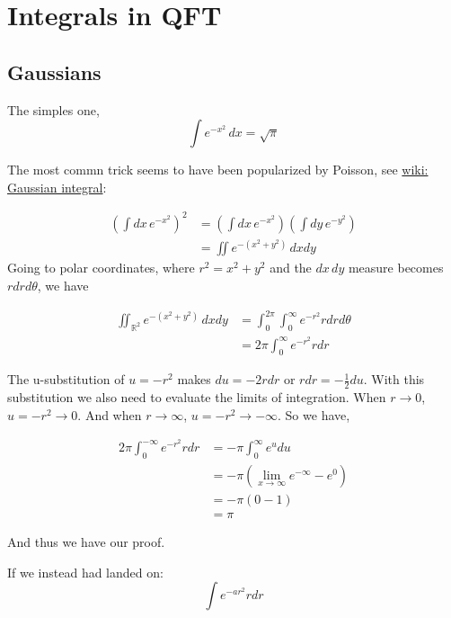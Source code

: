 \chapter{Integrals in QFT}



\section{Gaussians}

The simples one,
$$
\int e^{-x^2} \, dx = \sqrt{\pi}
$$

The most commn trick seems to have been popularized by Poisson, see
\href{https://en.wikipedia.org/wiki/Gaussian_integral}{wiki: Gaussian integral}:

\begin{align*}
\left( \int dx \, e^{-x^2} \right)^2 &= \left( \int dx \, e^{-x^2} \right) \left( \int dy \, e^{-y^2} \right) \\
&= \iint e^{-\left(x^2 + y^2\right)} \, dx dy
\end{align*}
Going to polar coordinates, where $r^2 = x^2 + y^2$ and the $dx \, dy$ measure becomes $r dr d\theta$, we have

\begin{align*}
\iint_{\mathbb{R}^2} e^{-\left(x^2 + y^2\right)} \, dx dy &=
    \int_{0}^{2\pi} \int_{0}^{\infty} e^{-r^2} r dr d\theta \\
&= 2\pi \int_{0}^{\infty} e^{-r^2} r dr
\end{align*}

The u-substitution of $u = -r^2$ makes $du = -2r dr$ or $r dr = -\frac{1}{2} du$.
With this substitution we also need to evaluate the limits of integration.
When $r \rightarrow 0$, $u = -r^2 \rightarrow 0$.
And when $r \rightarrow \infty$, $u = -r^2 \rightarrow -\infty$.
So we have,

\begin{align*}
2\pi \int_{0}^{-\infty} e^{-r^2} r dr &= -\pi \int_{0}^{\infty} e^{u} du \\
&= -\pi \left( \lim_{x\rightarrow \infty} e^{-\infty} - e^0 \right) \\
&= -\pi \left( 0 - 1  \right) \\
&= \pi
\end{align*}

And thus we have our proof.

If we instead had landed on:
$$
\int e^{-ar^2} r dr
$$

